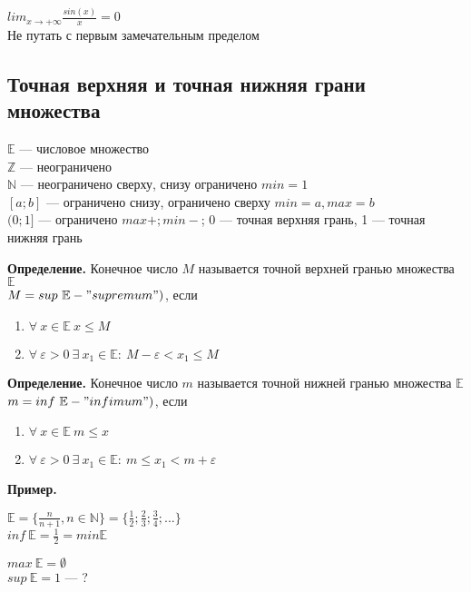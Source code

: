 \documentclass{article}
\begin{document}
    \( lim_{x \rightarrow +\infty} \frac{sin(x)}{x} = 0\)\\
    Не путать с первым замечательным пределом

    \subsection{Точная верхняя и точная нижняя грани множества}
    \( \mathbb{E} \) --- числовое множество\\
    \( \mathbb{Z} \) --- неограничено\\
    \( \mathbb{N} \) --- неограничено сверху, снизу ограничено \( min = 1 \)\\
    \( [a; b] \) --- ограничено снизу, ограничено сверху \( min = a, max = b \)\\
    \( (0; 1] \) --- ограничено \( max +;  min - \); 0 --- точная верхняя грань, 1 --- точная нижняя грань

    \textbf{Определение.} Конечное число \(M\) называется точной верхней гранью множества \(\mathbb{E}\)\\ 
    \(M = sup\ \mathbb{E} - "supremum")\), если
    \begin{enumerate}
        \item \( \forall\ x \in \mathbb{E}\ x \leq M \)
        \item \( \forall\ \varepsilon > 0\ \exists\ x_1 \in \mathbb{E}:\ M - \varepsilon < x_1 \leq M \)
    \end{enumerate}
    
    \textbf{Определение.} Конечное число \(m\) называется точной нижней гранью множества \(\mathbb{E}\)\\
    \(m = inf\ \mathbb{E} - "infimum")\), если
    \begin{enumerate}
        \item \( \forall\ x \in \mathbb{E}\ m \leq x \)
        \item \( \forall\ \varepsilon > 0\ \exists\ x_1 \in \mathbb{E}:\ m \leq x_1 < m + \varepsilon \)
    \end{enumerate}

    \textbf{Пример.}
    
    \( \mathbb{E} = \{ \frac{n}{n + 1}, n \in \mathbb{N} \} = \{ \frac{1}{2}; \frac{2}{3}; \frac{3}{4}; ... \} \)\\
    \( inf\ \mathbb{E} = \frac{1}{2} = min \mathbb{E} \)

    \(max\ \mathbb{E} = \emptyset\)\\
    \(sup\ \mathbb{E} = 1\) --- ?
\end{document}
